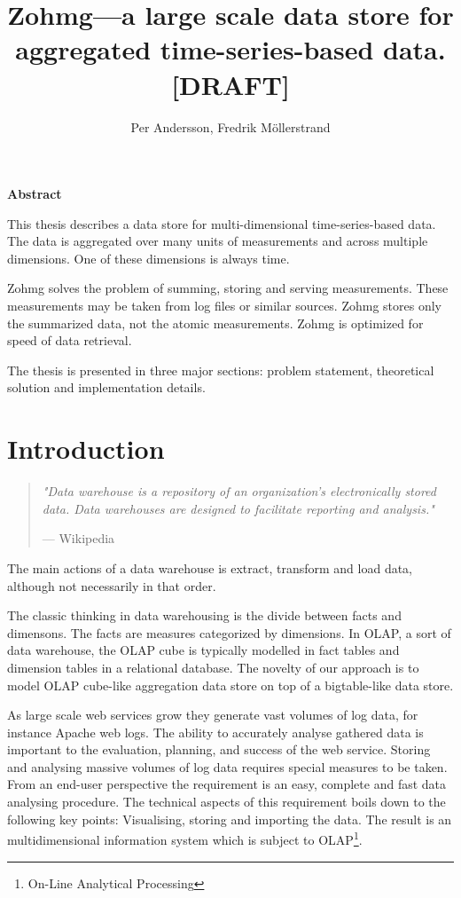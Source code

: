 \documentclass[a4paper,10pt]{book}
\author{Per Andersson, Fredrik M{\"o}llerstrand}
\title{Zohmg---a large scale data store for aggregated time-series-based
data. [DRAFT]}
\newcommand{\chapterquote}[2] {
\begin{quote}
\textit{"{#1}"}

--- {#2}
\end{quote}

\vspace{24pt}
}
\begin{document}
\maketitle

\noindent \Large{\textbf{Abstract}}

\vspace{12pt}

\noindent 
This thesis describes a data store for multi-dimensional time-series-based
data. The data is aggregated over many units of measurements and across
multiple dimensions. One of these dimensions is always time.

Zohmg solves the problem of summing, storing and serving measurements. These
measurements may be taken from log files or similar sources. Zohmg stores only
the summarized data, not the atomic measurements. Zohmg is optimized for speed
of data retrieval.

The thesis is presented in three major sections: problem statement,
theoretical solution and implementation details.


\tableofcontents

\vfill

\pagebreak

\chapter{Introduction}


\chapterquote{Data warehouse is a repository of an organization's
electronically stored data. Data warehouses are designed to facilitate
reporting and analysis.}{Wikipedia}

The main actions of a data warehouse is extract, transform and load data,
although not necessarily in that order.

The classic thinking in data warehousing is the divide between facts and
dimensons. The facts are measures categorized by dimensions. In OLAP, a sort
of data warehouse, the OLAP cube is typically modelled in fact tables and
dimension tables in a relational database. The novelty of our approach is to
model OLAP cube-like aggregation data store on top of a bigtable-like data
store.


As large scale web services grow they generate vast volumes of log data,
for instance Apache web logs. The ability to accurately analyse gathered
data is important to the evaluation, planning, and success of the web
service. Storing and analysing massive volumes of log data requires
special measures to be taken. From an end-user perspective the requirement
is an easy, complete and fast data analysing procedure. The technical
aspects of this requirement boils down to the following key points:
Visualising, storing and importing the data. The result is an
multidimensional information system which is subject to
OLAP\footnote{On-Line Analytical Processing}. \cite{olap_solutions}
\end{document}
